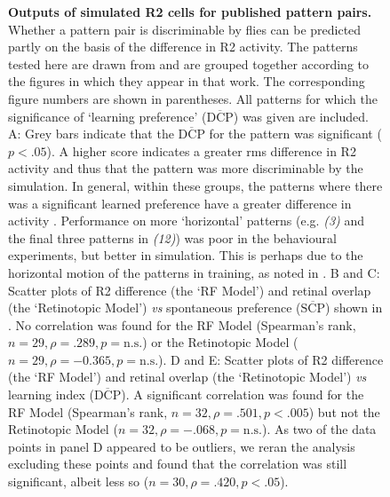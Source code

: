 \documentclass[10pt]{article}
\begin{document}
\begin{figure}
	\caption{
		{\bf Outputs of simulated R2 cells for published pattern pairs.}
		Whether a pattern pair is discriminable by flies can be predicted partly on the basis of the difference in R2 activity.
		The patterns tested here are drawn from \protect\cite{Ernst1999} and are grouped together according to the figures in which they appear in that work.
		The corresponding figure numbers are shown in parentheses.
		All patterns for which the significance of `learning preference' ($\overline{\mathrm{DCP}}$) was given are included.
		A: Grey bars indicate that the $\overline{\mathrm{DCP}}$ for the pattern was significant ($p<.05$).
		A higher score indicates a greater \ac{rms} difference in R2 activity and thus that the pattern was more discriminable by the simulation.
		In general, within these groups, the patterns where there was a significant learned preference have a greater difference in activity \protect\cite{Ernst1999}.
		Performance on more `horizontal' patterns (e.g. \emph{(3)} and the final three patterns in \emph{(12)}) was poor in the behavioural experiments, but better in simulation.
		This is perhaps due to the horizontal motion of the patterns in training, as noted in \protect\cite{Ernst1999}.
		B and C: Scatter plots of R2 difference (the `RF Model') and retinal overlap (the `Retinotopic Model') \emph{vs} spontaneous preference ($\overline{\mathrm{SCP}}$) shown in \protect\cite{Ernst1999}.
		No correlation was found for the RF Model (Spearman's rank, $n=29, \rho=.289, p=\mathrm{n.s.}$) or the Retinotopic Model ($n=29, \rho= -0.365, p=\mathrm{n.s.}$).
		D and E: Scatter plots of R2 difference (the `RF Model') and retinal overlap (the `Retinotopic Model') \emph{vs} learning index ($\overline{\mathrm{DCP}}$).
		A significant correlation was found for the RF Model (Spearman's rank, $n=32, \rho=.501, p < .005$) but not the Retinotopic Model ($n=32, \rho=-.068,p=\mathrm{n.s.}$).
		As two of the data points in panel D appeared to be outliers, we reran the analysis excluding these points and found that the correlation was still significant, albeit less so ($n=30, \rho=.420, p < .05$).
		}
	\label{fig:pattern}
\end{figure}
\end{document}
